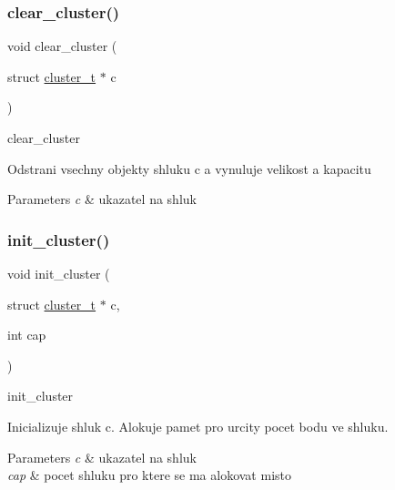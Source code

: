 \subsubsection{\texorpdfstring{clear\+\_\+cluster()}{clear\_cluster()}}
{\footnotesize\ttfamily void clear\+\_\+cluster (\begin{DoxyParamCaption}\item[{struct \hyperlink{structcluster__t}{cluster\+\_\+t} $\ast$}]{c }\end{DoxyParamCaption})}



clear\+\_\+cluster 

Odstrani vsechny objekty shluku \textquotesingle{}c\textquotesingle{} a vynuluje velikost a kapacitu 
\begin{DoxyParams}{Parameters}
{\em c} & ukazatel na shluk \\
\hline
\end{DoxyParams}
\hypertarget{group__Prace__se__shluky_ga96db0862471d90abb3d80103ef3695f7}{}\label{group__Prace__se__shluky_ga96db0862471d90abb3d80103ef3695f7} 
\subsubsection{\texorpdfstring{init\+\_\+cluster()}{init\_cluster()}}
{\footnotesize\ttfamily void init\+\_\+cluster (\begin{DoxyParamCaption}\item[{struct \hyperlink{structcluster__t}{cluster\+\_\+t} $\ast$}]{c,  }\item[{int}]{cap }\end{DoxyParamCaption})}



init\+\_\+cluster 

Inicializuje shluk \textquotesingle{}c\textquotesingle{}. Alokuje pamet pro urcity pocet bodu ve shluku. 
\begin{DoxyParams}{Parameters}
{\em c} & ukazatel na shluk \\
\hline
{\em cap} & pocet shluku pro ktere se ma alokovat misto \\
\hline
\end{DoxyParams}
\hypertarget{group__Prace__se__shluky_gac39a25fdec1f4952ec92ee5407893158}{}\label{group__Prace__se__shluky_gac39a25fdec1f4952ec92ee5407893158} 
